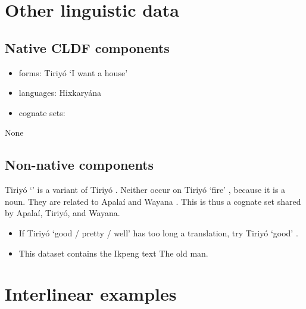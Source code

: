 \documentclass{article}
\begin{document}
\section{\texorpdfstring{Other linguistic data
\label{sec:data}}{Other linguistic data }}

\subsection{\texorpdfstring{Native CLDF
components\label{native-cldf-components}}{Native CLDF components}}

\begin{itemize}
\tightlist
\item
  forms: Tiriyó  `I want a house'
  \parencites[417]{triomeira1999}
\item
  languages: Hixkaryána
\item
  cognate sets:
\end{itemize}

None

\subsection{\texorpdfstring{Non-native
components\label{non-native-components}}{Non-native components}}

Tiriyó  `' \parencites[327]{triomeira1999} is a variant
of Tiriyó  \parencites[327]{triomeira1999}. Neither occur on
Tiriyó  `fire' \parencites[314]{triomeira1999}, because it is
a noun. They are related to Apalaí 
\parencites[77]{koehn1986apalai} and Wayana 
\parencites[236]{wayanatavares2005}. This is thus a cognate set shared
by Apalaí, Tiriyó, and Wayana.

\begin{itemize}
\item
  If Tiriyó  `good / pretty / well'
  \parencites[345]{triomeira1999} has too long a translation, try Tiriyó
   `good' \parencites[345]{triomeira1999}.
\item
  This dataset contains the Ikpeng text The old man.
\end{itemize}

\section{\texorpdfstring{Interlinear
examples\label{interlinear-examples}}{Interlinear examples}}
\end{document}
